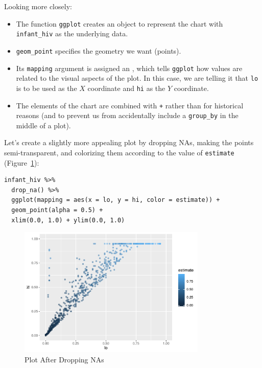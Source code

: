 Looking more closely:

\begin{itemize}
\item
  The function \texttt{ggplot} creates an object to represent the chart with \texttt{infant\_hiv} as the underlying data.
\item
  \texttt{geom\_point} specifies the geometry we want (points).
\item
  Its \texttt{mapping} argument is assigned an ,
  which tells \texttt{ggplot} how values are related to the visual aspects of the plot.
  In this case,
  we are telling it that \texttt{lo} is to be used as the $X$ coordinate
  and \texttt{hi} as the $Y$ coordinate.
\item
  The elements of the chart are combined with \texttt{+} rather than \texttt{\pipe} for historical reasons
  (and to prevent us from accidentally include a \texttt{group\_by} in the middle of a plot).
\end{itemize}

Let's create a slightly more appealing plot by dropping NAs,
making the points semi-transparent,
and colorizing them according to the value of \texttt{estimate} (Figure~\ref{fig:plot-after-drop}):

\begin{lstlisting}
infant_hiv %>%
  drop_na() %>%
  ggplot(mapping = aes(x = lo, y = hi, color = estimate)) +
  geom_point(alpha = 0.5) +
  xlim(0.0, 1.0) + ylim(0.0, 1.0)
\end{lstlisting}

\begin{figure}[h]
  \includegraphics[width=0.8\textwidth]{figures/tidyverse/plot-after-drop-1.pdf}
  \caption{Plot After Dropping NAs}
  \label{fig:plot-after-drop}
\end{figure}

